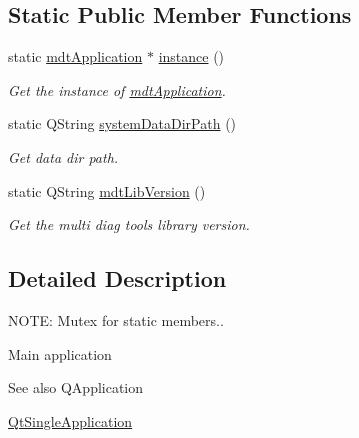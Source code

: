 \subsection*{Static Public Member Functions}
\begin{DoxyCompactItemize}
\item 
static \hyperlink{classmdt_application}{mdtApplication} $\ast$ \hyperlink{classmdt_application_a365ac79934070b0e5a42d2c7cd9b076d}{instance} ()
\begin{DoxyCompactList}\small\item\em Get the instance of \hyperlink{classmdt_application}{mdtApplication}. \end{DoxyCompactList}\item 
\hypertarget{classmdt_application_af17bb16e420c91af3d0ad1970714388c}{
static QString \hyperlink{classmdt_application_af17bb16e420c91af3d0ad1970714388c}{systemDataDirPath} ()}
\label{classmdt_application_af17bb16e420c91af3d0ad1970714388c}

\begin{DoxyCompactList}\small\item\em Get data dir path. \end{DoxyCompactList}\item 
\hypertarget{classmdt_application_ad5318086812dad2c2870e294703caa51}{
static QString \hyperlink{classmdt_application_ad5318086812dad2c2870e294703caa51}{mdtLibVersion} ()}
\label{classmdt_application_ad5318086812dad2c2870e294703caa51}

\begin{DoxyCompactList}\small\item\em Get the multi diag tools library version. \end{DoxyCompactList}\end{DoxyCompactItemize}


\subsection{Detailed Description}
NOTE: Mutex for static members.. 

Main application

\begin{DoxySeeAlso}{See also}
QApplication 

\hyperlink{class_qt_single_application}{QtSingleApplication} 
\end{DoxySeeAlso}


